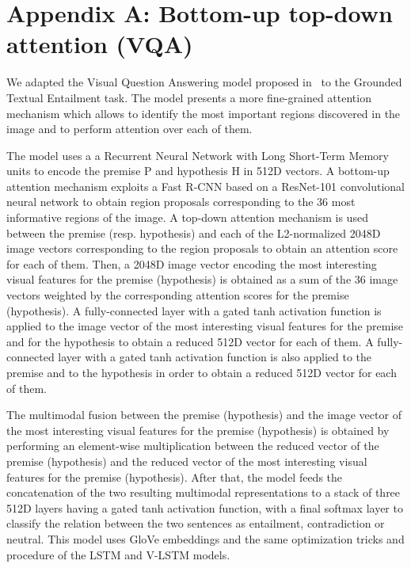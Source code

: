 \documentclass[11pt]{article}
\begin{document}
\section*{Appendix A: Bottom-up top-down attention (VQA)}
We adapted the Visual Question Answering model proposed
in~\cite{Anderson2017up-down,teney2017:tips} to the Grounded Textual
Entailment task. The model presents a more fine-grained attention
mechanism which allows to identify the most important regions
discovered in the image and to perform attention over each of
them.

The model uses a a Recurrent Neural Network with Long Short-Term Memory units to encode the premise P and hypothesis H in 512D vectors. A bottom-up attention mechanism exploits a Fast R-CNN \cite{girshick2015:fastrcnn} based on
a ResNet-101 convolutional neural network \cite{he2016:resnet} to
obtain region proposals corresponding to the 36 most informative
regions of the image. A top-down attention mechanism is used
between the premise (resp. hypothesis) and each of the L2-normalized 2048D
image vectors corresponding to the region proposals to obtain an
attention score for each of them. Then, a 2048D image vector encoding
the most interesting visual features for the premise (hypothesis) is
obtained as a sum of the 36 image vectors weighted by the
corresponding attention scores for the premise (hypothesis). A
fully-connected layer with a gated tanh activation function is applied
to the image vector of the most interesting visual features for the
premise and for the hypothesis to obtain a reduced 512D vector for
each of them. A fully-connected layer with a gated tanh activation
function is also applied to the premise and to the hypothesis in order
to obtain a reduced 512D vector for each of them. 

The multimodal
fusion between the premise (hypothesis) and the image vector of the
most interesting visual features for the premise (hypothesis) is
obtained by performing an element-wise multiplication between the
reduced vector of the premise (hypothesis) and the reduced vector of
the most interesting visual features for the premise
(hypothesis). After that, the model feeds the concatenation of the two
resulting multimodal representations to a stack of three 512D layers
having a gated tanh activation function, with a final softmax layer to
classify the relation between the two sentences as entailment,
contradiction or neutral. This model uses GloVe embeddings and the
same optimization tricks and procedure of the LSTM and V-LSTM models.
\end{document}
